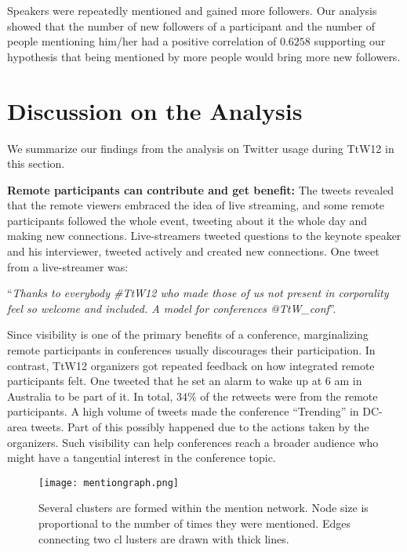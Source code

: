 \documentclass[conference,final]{IEEEtran}
\begin{document}
Speakers were repeatedly mentioned and gained more followers. Our analysis showed that the number of new followers of a participant and the number of people mentioning him/her had a positive correlation of $0.6258$ supporting our hypothesis that being mentioned by more people would bring more new followers.

\section{Discussion on the Analysis}
We summarize our findings from the analysis on Twitter usage  during TtW12 in this section.

\textbf{Remote participants can contribute and get benefit:} The tweets revealed that the remote viewers embraced the idea of live streaming, and some remote participants followed the whole event, tweeting about it the whole day and making new connections. Live-streamers tweeted questions to the keynote speaker and his interviewer, tweeted actively and created new connections. One tweet from a live-streamer was:
	
``\textit{Thanks to everybody \#TtW12 who made those of us not present in corporality feel so welcome and included. A model for conferences @TtW\_conf}''. 

Since visibility is one of the primary benefits of a conference, marginalizing remote participants in conferences usually discourages their participation. In contrast, TtW12 organizers got repeated feedback on how integrated remote participants felt. One tweeted that he set an alarm to wake up at 6 am in Australia to be part of it. In total, $34\%$ of the retweets were from the remote participants. A high volume of tweets made the conference ``Trending'' in DC-area tweets. Part of this possibly happened due to the actions taken by the organizers. Such visibility can help conferences reach a broader audience who might have a tangential interest in the conference topic. 

\begin{figure}[htbp]
	\centering
		\texttt{[image: mentiongraph.png]}
	\caption{Several clusters are formed within the mention network. Node size is proportional to the number of times they were mentioned. Edges connecting two cl lusters are drawn with thick lines. }
	\label{fig:mentiongraph}
\end{figure}
\end{document}
